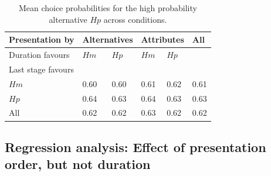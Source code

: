 \documentclass[11pt, a4paper, twocolumn, abstract]{scrartcl}
\begin{document}

\begin{table}[bt!]
\begin{centering}
\begin{tabular}{@{}llllll@{}}
\toprule
Presentation by & \multicolumn{2}{l}{Alternatives} & \multicolumn{2}{l}{Attributes} &    All \\ \midrule
Duration favours &     $Hm$ & $Hp$ &   $Hm$ & \multicolumn{2}{l}{$Hp$}        \\
Last stage favours &              &          &            &          &        \\
$Hm$               &        0.60 &    0.60 &      0.61 &    0.62 &  0.61 \\
$Hp$               &        0.64 &    0.63 &      0.64 &    0.63 &  0.63 \\ \midrule
All                &        0.62 &    0.62 &      0.63 &    0.62 &  0.62 \\
\bottomrule
\end{tabular}
\caption{Mean choice probabilities for the high probability alternative $Hp$ across conditions.}
\label{tab:choiceprobs}
\end{centering}
\end{table}

\subsection*{Regression analysis: Effect of presentation order, but not duration}
\end{document}

